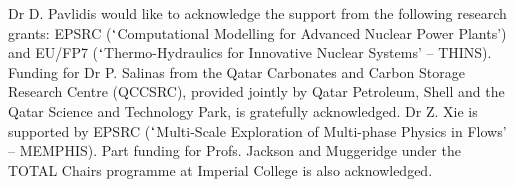 \documentclass[preprint,authoryear,12pt]{elsarticle}
\begin{document}
\ack Dr D. Pavlidis would like to acknowledge the support from the
following research grants: EPSRC ($\lq$Computational Modelling for
Advanced Nuclear Power Plants') and EU/FP7 ($\lq$Thermo-Hydraulics for
Innovative Nuclear Systems' -- THINS). Funding for Dr P. Salinas from
the Qatar Carbonates and Carbon Storage Research Centre (QCCSRC),
provided jointly by Qatar Petroleum, Shell and the Qatar Science and
Technology Park, is gratefully acknowledged. Dr Z. Xie is supported by
EPSRC ($\lq$Multi-Scale Exploration of Multi-phase Physics in Flows' --
MEMPHIS). Part funding for Profs. Jackson and Muggeridge under the
TOTAL Chairs programme at Imperial College is also acknowledged.







\pagebreak
\clearpage

\listoffigures
\pagebreak
\clearpage


%
\end{document}
